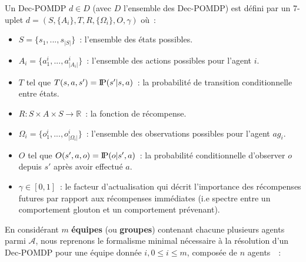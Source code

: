 \documentclass[francais,ROIA,Unicode,manuscript]{cedram}
\newcommand{\probP}{\text{I\kern-0.15em P}}
\begin{document}
Un Dec-POMDP $d \in D$ (avec $D$ l'ensemble des Dec-POMDP) est défini par un 7-uplet $d = (S,\{A_i\},T,R,\{\Omega_i\},O,\gamma)$ où~:
\begin{itemize}
    \item $S = \{s_1, ..., s_{|S|}\}$~: l'ensemble des états possibles.
    \item $A_i = \{a_1^i, ..., a_{|A_i|}^i\}$~: l'ensemble des actions possibles pour l'agent $i$.
    \item $T$ tel que $T(s,a,s') = \probP(s'|s,a)$~: la probabilité de transition conditionnelle entre états.
    \item $R: S \times A \times S \rightarrow \mathbb{R}$~: la fonction de récompense.
    \item $\Omega_i = \{o_1^i, ..., o_{|\Omega_i|}^i\}$~: l'ensemble des observations possibles pour l'agent $ag_i$.
    \item $O$ tel que $O(s',a,o) = \probP(o|s',a)$~: la probabilité conditionnelle d'observer $o$ depuis $s'$ après avoir effectué $a$.
    \item $\gamma \in [0,1]$~: le facteur d'actualisation qui décrit l'importance des récompenses futures par rapport aux récompenses immédiates (i.e spectre entre un comportement glouton et un comportement prévenant).
\end{itemize}

En considérant $m$ \textbf{équipes} (ou \textbf{groupes}) contenant chacune plusieurs agents parmi $\mathcal{A}$, nous reprenons le formalisme minimal nécessaire à la résolution d'un Dec-POMDP pour une équipe donnée $i, 0 \leq i \leq m$, composée de $n$ agents~\cite{Beynier2013,Albrecht2024}~:
\end{document}

